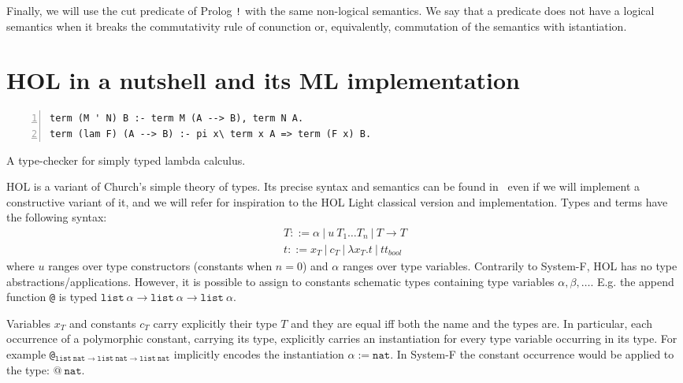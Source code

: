 \documentclass[preprint]{sigplanconf}
\begin{document}
Finally, we will use the cut predicate of Prolog \texttt{!} with the same
non-logical semantics. We say that a predicate does not have a logical semantics
when it breaks the commutativity rule of conunction or, equivalently, commutation of the semantics with istantiation.
\section{HOL in a nutshell and its ML implementation}
\begin{table}[t]
\begin{small}
\begin{Verbatim}[numbers=left,numbersep=1pt,frame=leftline]
term (M ' N) B :- term M (A --> B), term N A.
term (lam F) (A --> B) :- pi x\ term x A => term (F x) B.
\end{Verbatim}
\end{small}
\caption{\label{type-checker1}A type-checker for simply typed lambda calculus.}
\end{table}
HOL is a variant of Church's simple theory of types. Its precise syntax and semantics can be found in~\cite{the_HOL_system_LOGIC} even if we will implement a constructive variant of it, and we will refer for inspiration to the HOL Light classical version and implementation. Types and terms have the
following syntax:
$$\begin{array}{l}
T ::= \alpha ~|~ u~T_1\ldots T_n ~|~ T \rightarrow T\\
t ::= x_T ~|~ c_T ~|~ \lambda x_T. t ~|~ {tt_{bool}}
\end{array}$$
where $u$ ranges over type constructors (constants when $n=0$) and $\alpha$
ranges over type variables. Contrarily to System-F,
HOL has no type
abstractions/applications. However, it is possible to assign to constants
schematic types containing type variables $\alpha, \beta, \ldots$. E.g.
the append function \texttt{@} is typed $\mathtt{list}~\alpha \rightarrow \mathtt{list}~\alpha \rightarrow \mathtt{list}~\alpha$.

Variables $x_T$ and constants $c_T$ carry explicitly their type $T$ and they are equal iff both the name and the types are. In particular, each occurrence of a polymorphic constant, carrying its type, explicitly carries an instantiation for every type variable occurring in its type. For example
\texttt{@}$_{\mathtt{list}~\mathtt{nat} \rightarrow \mathtt{list}~\mathtt{nat} \rightarrow \mathtt{list}~\mathtt{nat}}$ implicitly encodes the instantiation $\alpha := \mathtt{nat}$. In System-F the constant occurrence would be applied to the type: $\texttt{@}~\mathtt{nat}$.
\end{document}
